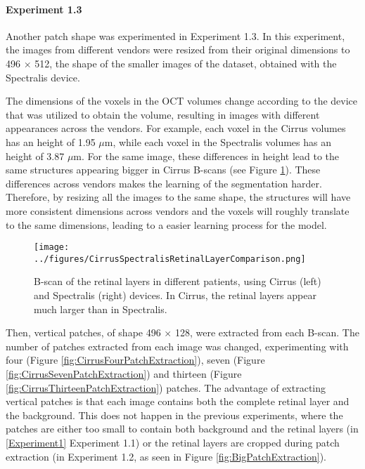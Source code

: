 \paragraph{Experiment 1.3}
Another patch shape was experimented in Experiment 1.3. In this experiment, the images from different vendors were resized from their original dimensions to 496 $\times$ 512, the shape of the smaller images of the dataset, obtained with the Spectralis device. 
\par
The dimensions of the voxels in the OCT volumes change according to the device that was utilized to obtain the volume, resulting in images with different appearances across the vendors. For example, each voxel in the Cirrus volumes has an height of 1.95 $\mu$m, while each voxel in the Spectralis volumes has an height of 3.87 $\mu$m. For the same image, these differences in height lead to the same structures appearing bigger in Cirrus B-scans (see Figure \ref{fig:CirrusSpectralisRetinalLayerComparison}). These differences across vendors makes the learning of the segmentation harder. Therefore, by resizing all the images to the same shape, the structures will have more consistent dimensions across vendors and the voxels will roughly translate to the same dimensions, leading to a easier learning process for the model.

\begin{figure}[!ht]
	\centering
	\texttt{[image: ../figures/CirrusSpectralisRetinalLayerComparison.png]}
	\caption{B-scan of the retinal layers in different patients, using Cirrus (left) and Spectralis (right) devices. In Cirrus, the retinal layers appear much larger than in Spectralis.}
	\label{fig:CirrusSpectralisRetinalLayerComparison}
\end{figure}

Then, vertical patches, of shape 496 $\times$ 128, were extracted from each B-scan. The number of patches extracted from each image was changed, experimenting with four (Figure \ref{fig:CirrusFourPatchExtraction}), seven (Figure \ref{fig:CirrusSevenPatchExtraction}) and thirteen (Figure \ref{fig:CirrusThirteenPatchExtraction}) patches. The advantage of extracting vertical patches is that each image contains both the complete retinal layer and the background. This does not happen in the previous experiments, where the patches are either too small to contain both background and the retinal layers (in \ref{Experiment1} Experiment 1.1) or the retinal layers are cropped during patch extraction (in Experiment 1.2, as seen in Figure \ref{fig:BigPatchExtraction}).

